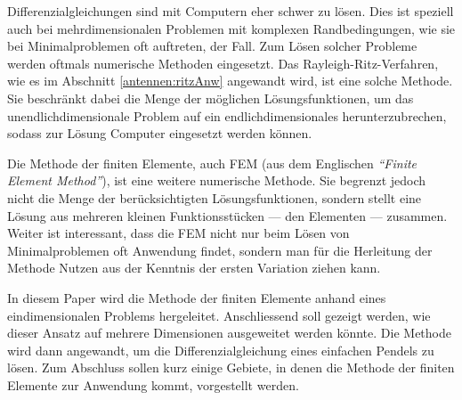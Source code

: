 %
%
%
%


\noindent
Differenzialgleichungen sind mit Computern eher schwer zu lösen. 
Dies ist speziell auch bei mehrdimensionalen Problemen mit komplexen
Randbedingungen, wie sie bei Minimalproblemen oft auftreten, der
Fall.
Zum Lösen solcher Probleme werden oftmals numerische Methoden eingesetzt. 
Das Rayleigh-Ritz-Verfahren, wie es im Abschnitt \ref{antennen:ritzAnw}
angewandt wird, ist eine solche Methode.
%
%
Sie beschränkt dabei die Menge der möglichen Lösungsfunktionen, um
das unendlichdimensionale Problem auf ein endlichdimensionales
herunterzubrechen, sodass zur Lösung Computer eingesetzt werden
können.

Die Methode der finiten Elemente, auch FEM (aus dem Englischen {\em
``Finite Element Method''}), ist eine weitere numerische Methode.
Sie begrenzt jedoch nicht die Menge der berücksichtigten
Lösungsfunktionen, sondern stellt eine Lösung aus mehreren kleinen
Funktionsstücken --- den Elementen --- zusammen.
%
Weiter ist interessant, dass die FEM nicht nur beim Lösen von
Minimalproblemen oft Anwendung findet, sondern man für die Herleitung
der Methode Nutzen aus der Kenntnis der ersten Variation ziehen
kann.

In diesem Paper wird die Methode der finiten Elemente anhand eines
eindimensionalen Problems hergeleitet.
Anschliessend soll gezeigt werden, wie dieser Ansatz auf mehrere
Dimensionen ausgeweitet werden könnte.
Die Methode wird dann angewandt, um die Differenzialgleichung eines
einfachen Pendels zu lösen.
Zum Abschluss sollen kurz einige Gebiete, in denen die Methode der
finiten Elemente zur Anwendung kommt, vorgestellt werden.


